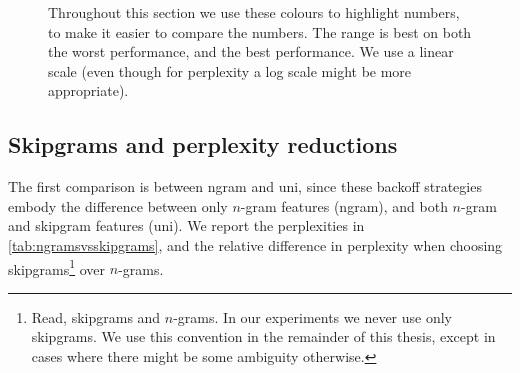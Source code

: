 \begin{figure}
\caption{Throughout this section we use these colours to highlight numbers, to make it easier to compare the numbers. The range is best on both the \textcolor{worstclr!50}{worst performance}, and the \textcolor{bestclr!50}{best performance}. We use a linear scale (even though for perplexity a log scale might be more appropriate).}
\label{fig:colourrange}
\end{figure}


\subsection{Skipgrams and perplexity reductions}
The first comparison is between \textsf{ngram} and \textsf{uni}, since these backoff strategies embody the difference between only $n$-gram features (\textsf{ngram}), and both $n$-gram and skipgram features (\textsf{uni}). We report the perplexities in \cref{tab:ngramsvsskipgrams}, and the relative difference in perplexity when choosing skipgrams\footnote{Read, skipgrams and $n$-grams. In our experiments we never use only skipgrams. We use this convention in the remainder of this thesis, except in cases where there might be some ambiguity otherwise.} over $n$-grams.

